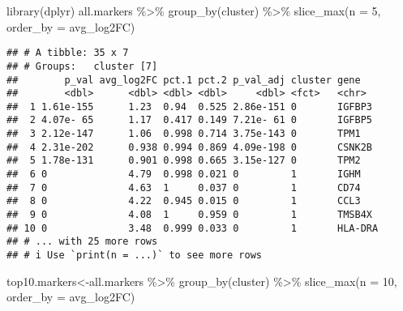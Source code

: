 \documentclass[
  openany]{book}
\newenvironment{Shaded}{\begin{snugshade}}{\end{snugshade}}
\newcommand{\AttributeTok}[1]{\textcolor[rgb]{0.77,0.63,0.00}{#1}}
\newcommand{\DecValTok}[1]{\textcolor[rgb]{0.00,0.00,0.81}{#1}}
\newcommand{\FunctionTok}[1]{\textcolor[rgb]{0.00,0.00,0.00}{#1}}
\newcommand{\NormalTok}[1]{#1}
\newcommand{\OtherTok}[1]{\textcolor[rgb]{0.56,0.35,0.01}{#1}}
\newcommand{\SpecialCharTok}[1]{\textcolor[rgb]{0.00,0.00,0.00}{#1}}
\begin{document}
\begin{Shaded}
\begin{Highlighting}[]
\FunctionTok{library}\NormalTok{(dplyr)}
\NormalTok{all.markers }\SpecialCharTok{\%\textgreater{}\%}
  \FunctionTok{group\_by}\NormalTok{(cluster) }\SpecialCharTok{\%\textgreater{}\%}
  \FunctionTok{slice\_max}\NormalTok{(}\AttributeTok{n =} \DecValTok{5}\NormalTok{, }\AttributeTok{order\_by =}\NormalTok{ avg\_log2FC)}
\end{Highlighting}
\end{Shaded}

\begin{verbatim}
## # A tibble: 35 x 7
## # Groups:   cluster [7]
##        p_val avg_log2FC pct.1 pct.2 p_val_adj cluster gene   
##        <dbl>      <dbl> <dbl> <dbl>     <dbl> <fct>   <chr>  
##  1 1.61e-155      1.23  0.94  0.525 2.86e-151 0       IGFBP3 
##  2 4.07e- 65      1.17  0.417 0.149 7.21e- 61 0       IGFBP5 
##  3 2.12e-147      1.06  0.998 0.714 3.75e-143 0       TPM1   
##  4 2.31e-202      0.938 0.994 0.869 4.09e-198 0       CSNK2B 
##  5 1.78e-131      0.901 0.998 0.665 3.15e-127 0       TPM2   
##  6 0              4.79  0.998 0.021 0         1       IGHM   
##  7 0              4.63  1     0.037 0         1       CD74   
##  8 0              4.22  0.945 0.015 0         1       CCL3   
##  9 0              4.08  1     0.959 0         1       TMSB4X 
## 10 0              3.48  0.999 0.033 0         1       HLA-DRA
## # ... with 25 more rows
## # i Use `print(n = ...)` to see more rows
\end{verbatim}

\begin{Shaded}
\begin{Highlighting}[]
\NormalTok{top10.markers}\OtherTok{\textless{}{-}}\NormalTok{all.markers }\SpecialCharTok{\%\textgreater{}\%}
    \FunctionTok{group\_by}\NormalTok{(cluster) }\SpecialCharTok{\%\textgreater{}\%}
    \FunctionTok{slice\_max}\NormalTok{(}\AttributeTok{n =} \DecValTok{10}\NormalTok{, }\AttributeTok{order\_by =}\NormalTok{ avg\_log2FC)}
\end{Highlighting}
\end{Shaded}

\begin{Shaded}
\end{Shaded}
\end{document}
